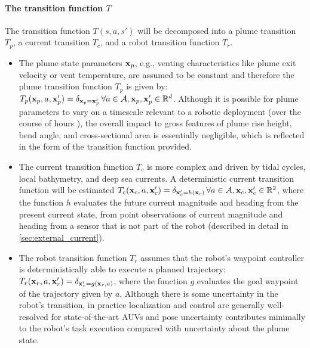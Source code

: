 \paragraph{The transition function $T$} The transition function $T(s, a, s')$ will be decomposed into a plume transition $T_p$, a current transition $T_c$, and a robot transition function $T_r$.
\begin{itemize}
	\item The plume state parameters $\mathbf{x}_p$, e.g., venting characteristics like plume exit velocity or vent temperature, are assumed to be constant and therefore the plume transition function $T_p$ is given by: $T_p(\mathbf{x}_p, a, \mathbf{x}_p') = \delta_{\mathbf{x}_p = \mathbf{x}_p'} \, \forall a \in \mathcal{A}, \mathbf{x}_p, \mathbf{x}_p' \in \mathbb{R}^d$. Although it is possible for plume parameters to vary on a timescale relevant to a robotic deployment (over the course of hours \autocite{chevaldonne1991time}), the overall impact to gross features of plume rise height, bend angle, and cross-sectional area is essentially negligible, which is reflected in the form of the transition function provided.
	\item The current transition function $T_c$ is more complex and driven by tidal cycles, local bathymetry, and deep sea currents. A deterministic current transition function will be estimated $T_c(\mathbf{x}_c, a, \mathbf{x}_c') = \delta_{\mathbf{x}_c' = h(\mathbf{x}_c)} \, \forall a \in \mathcal{A}, \mathbf{x}_c, \mathbf{x}_c' \in \mathbb{R}^2$, where the function $h$ evaluates the future current magnitude and heading from the present current state, from point observations of current magnitude and heading from a sensor that is not part of the robot (described in detail in \cref{sec:external_current}). 
	\item The robot transition function $T_r$ assumes that the robot's waypoint controller is deterministically able to execute a planned trajectory: $T_r(\mathbf{x}_r, a, \mathbf{x}_r') = \delta_{\mathbf{x}_r' = g(\mathbf{x}_r, a)}$, where the function $g$ evaluates the goal waypoint of the trajectory given by $a$. Although there is some uncertainty in the robot's transition, in practice localization and control are generally well-resolved for state-of-the-art AUVs and pose uncertainty contributes minimally to the robot's task execution compared with uncertainty about the plume state.
\end{itemize}


